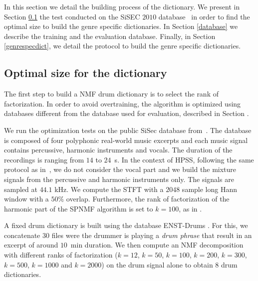 \documentclass{article}
\begin{document}
In this section we detail the building process of the dictionary. We present in Section \ref{optimalsize} the test conducted on the SiSEC $2010$ database~\cite{SiSec10} in order to find the optimal size to build the genre specific dictionaries. In Section \ref{database} we describe the training and the evaluation database. Finally, in Section \ref{genrespecdict}, we detail the protocol to build the genre specific dictionaries. 

\subsection{Optimal size for the dictionary}\label{optimalsize}

The first step to build a NMF drum dictionary is to select the rank of factorization. In order to avoid overtraining, the algorithm is optimized using databases different from the database used for evaluation, described in Section \label{database}. 

We run the optimization tests on the public SiSec database from~\cite{SiSec10}. The database is composed of four polyphonic real-world music excerpts and each music signal contains percussive, harmonic instruments and vocals. The duration of the recordings is ranging from $14$ to $24$~s. In the context of HPSS, following the same protocol as in~\cite{canadas2014percussive}, we do not consider the vocal part and we build the mixture signals from the percussive and harmonic instruments only. The signals are sampled at $44.1$ kHz. We compute the STFT with a $2048$ sample long Hann window with a $50\%$ overlap. Furthermore, the rank of factorization of the harmonic part of the SPNMF algorithm is set to $k=100$, as in \cite{larocheJournalhidden}.

A fixed drum dictionary is built using the database ENST-Drums \cite{gillet2006enst}. For this, we  concatenate $30$ files were the drummer is playing a \emph{drum phrase} that result in an excerpt of around $10$~min duration. We then compute an NMF decomposition with different ranks of factorization ($k=12$, $k=50$, $k=100$, $k=200$, $k=300$, $k=500$, $k=1000$ and $k=2000$) on the drum signal alone to obtain $8$ drum dictionaries.
\end{document}
